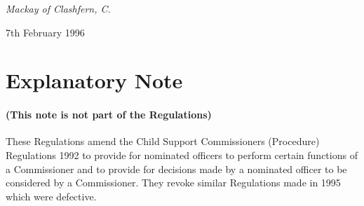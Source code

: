 \documentclass[a4paper]{article}
\newcommand{\parthead}{}
\begin{document}
\bigskip


{\raggedleft
\emph{Mackay of Clashfern, C.}%

}

7th February 1996

\part{Explanatory Note}

\renewcommand\parthead{--- Explanatory Note}

\subsection*{(This note is not part of the Regulations)}

These Regulations amend the Child Support Commissioners (Procedure) Regulations 1992 to provide for nominated officers to perform certain functions of a Commissioner and to provide for decisions made by a nominated officer to be considered by a Commissioner. They revoke similar Regulations made in 1995 which were defective.
\end{document}
